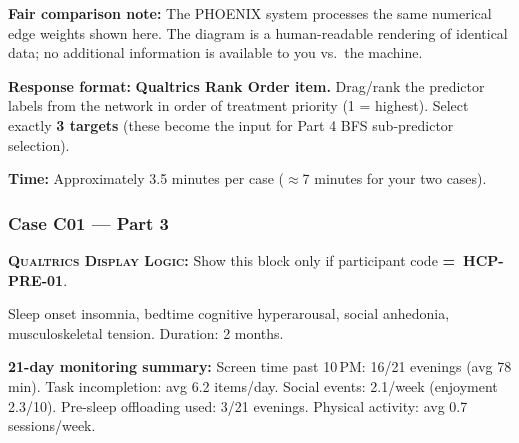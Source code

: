\documentclass[11pt,a4paper]{article}
\newcommand{\dlnote}[1]{\par\vspace{0.15em}\noindent\begin{tcolorbox}[colback=AccentAmber,colframe=GoldAmber,boxrule=0.45pt,arc=1mm,left=5pt,right=5pt,top=2.5pt,bottom=2.5pt]\footnotesize\textbf{\color{GoldAmber}\scshape Qualtrics Display Logic:} Show this block only if participant code \textbf{=~#1}.\end{tcolorbox}\vspace{0.1em}}
\begin{document}
\begin{tcolorbox}[colback=PartThreeBG,colframe=GoldAmber,arc=2.5mm,boxrule=0.9pt,left=10pt,right=10pt,top=9pt,bottom=9pt]
\textbf{Fair comparison note:} The PHOENIX system processes the same numerical edge weights shown here. The diagram is a human-readable rendering of identical data; no additional information is available to you vs.\ the machine.

\textbf{Response format:} \textbf{Qualtrics Rank Order item.} Drag/rank the predictor labels from the network in order of treatment priority (1 = highest). Select exactly \textbf{3 targets} (these become the input for Part 4 BFS sub-predictor selection).

\textbf{Time:} Approximately 3.5 minutes per case ($\approx$7 minutes for your two cases).
\end{tcolorbox}

\vspace{0.5em}

\subsubsection*{Case C01 --- Part 3}
\dlnote{HCP-PRE-01}

\begin{complaintbox}[title=Case C01 --- 28-year-old software developer]
\small Sleep onset insomnia, bedtime cognitive hyperarousal, social anhedonia, musculoskeletal tension. Duration: 2 months.
\end{complaintbox}

\begin{tcolorbox}[colback=SoftBG,colframe=BorderGrey,boxrule=0.5pt,arc=1.5mm,left=6pt,right=6pt,top=5pt,bottom=5pt]
\small\textbf{21-day monitoring summary:} Screen time past 10\,PM: 16/21 evenings (avg 78 min). Task incompletion: avg 6.2 items/day. Social events: 2.1/week (enjoyment 2.3/10). Pre-sleep offloading used: 3/21 evenings. Physical activity: avg 0.7 sessions/week.
\end{tcolorbox}
\end{document}
